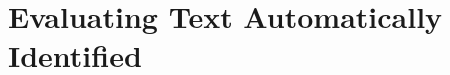 \setcounter{chapter}{5}
\setcounter{rq}{1}


\chapter{Evaluating Text Automatically Identified}
\label{ch:assisting}

























